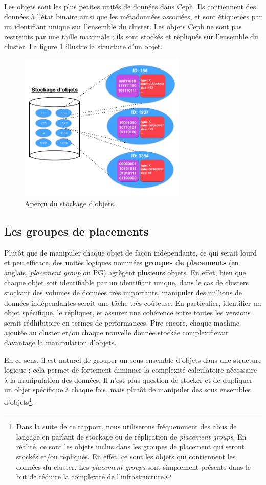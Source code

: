Les objets sont les plus petites unités de données dans Ceph. Ils contiennent des données à l'état binaire ainsi que les métadonnées associées, et sont étiquetées par un identifiant unique sur l'ensemble du cluster. Les objets Ceph ne sont pas restreints par une taille maximale ; ils sont stockés et répliqués sur l'ensemble du cluster. La figure \ref{chap2:objectStore} illustre la structure d'un objet.

\begin{figure}[h!]
    \centering
    \includegraphics[width=8cm]{./images/objectStore.png}
    \caption{\label{chap2:objectStore}Aperçu du stockage d'objets.}
\end{figure}

\subsection{Les groupes de placements}

Plutôt que de manipuler chaque objet de façon indépendante, ce qui serait lourd et peu efficace, des unités logiques nommées \og{}\textbf{groupes de placements}\fg{} (en anglais, \emph{placement group} ou PG) agrègent plusieurs objets. En effet, bien que chaque objet soit identifiable par un identifiant unique, dans le cas de clusters stockant des volumes de données très importants, manipuler des millions de données indépendantes serait une tâche très coûteuse. En particulier, identifier un objet spécifique, le répliquer, et assurer une cohérence entre toutes les versions serait rédhibitoire en termes de performances. Pire encore, chaque machine ajoutée au cluster et/ou chaque nouvelle donnée stockée complexifierait davantage la manipulation d'objets.

En ce sens, il est naturel de grouper un sous-ensemble d'objets dans une structure logique ; cela permet de fortement diminuer la complexité calculatoire nécessaire à la manipulation des données. Il n'est plus question de stocker et de dupliquer un objet spécifique à chaque fois, mais plutôt de manipuler des sous ensembles d'objets\footnote{Dans la suite de ce rapport, nous utiliserons fréquemment des abus de langage en parlant de stockage ou de réplication de \emph{placement groups}. En réalité, ce sont les objets inclus dans les groupes de placement qui seront stockés et/ou répliqués. En effet, ce sont les objets qui contiennent les données du cluster. Les \emph{placement groups} sont simplement présents dans le but de réduire la complexité de l'infrastructure.}. 

